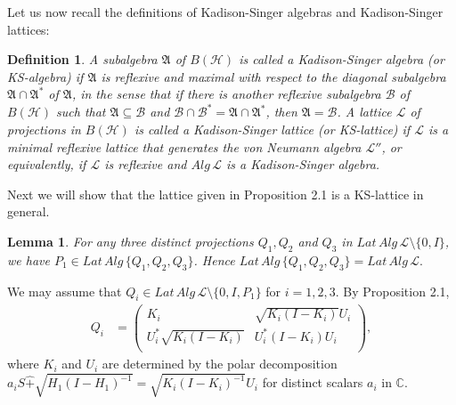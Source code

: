 \documentclass[12pt]{article}
\newtheorem{lemma}{Lemma}[section]
\newtheorem{df}{Definition}[section]
\newcommand{\AAA}{\mathfrak A} \newcommand{\TTT}{\mathfrak T}
\newcommand{\HHH}{\mathcal H} %
\newcommand{\LLL}{\mathcal L} %
\newcommand{\C}{\mathbb C} %
\def\L{{\mathcal{L}}}
\begin{document}
{Let us now recall the definitions of  Kadison-Singer algebras and
Kadison-Singer lattices:

\begin{df}
A subalgebra $\AAA$ of $B(\HHH)$ is called a Kadison-Singer algebra
(or KS-algebra) if $\AAA$ is reflexive and maximal with respect to
the diagonal subalgebra $\AAA \cap \AAA^*$ of $\AAA$, in the sense
that if there is another reflexive subalgebra $\mathcal{B}$ of
$B(\HHH)$ such that $\AAA \subseteq\mathcal{B}$ and
$\mathcal{B}\cap\mathcal{B}^*=\AAA \cap\AAA^*$, then
$\AAA=\mathcal{B}$. A lattice $\L$ of projections in $B(\HHH)$ is
called a Kadison-Singer lattice (or KS-lattice) if $\L$ is a minimal
reflexive lattice that generates the von Neumann algebra $\L''$, or
equivalently, if $\L$ is reflexive and $Alg\,\L$ is a Kadison-Singer
algebra.
\end{df}

Next we will show that the lattice given in Proposition 2.1 is a KS-lattice in general.

\begin{lemma}
For any three distinct projections $Q_1, Q_2$ and $Q_3$ in
$Lat\,Alg\,\LLL \setminus \{0, I \}$, we have $P_{1} \in
Lat\,Alg\,\{ Q_{1}, Q_{2}, Q_{3}\}$. Hence $Lat\,Alg\,\{Q_{1},
Q_{2}, Q_{3}\}=Lat\,Alg\,\L.$
\end{lemma}

\quad We may assume that $Q_i\in Lat\,Alg\,\LLL
\setminus \{0, I, P_1 \}$ for $i = 1,2,3$. By Proposition 2.1,
\begin{align*}
Q_{i}& =\left(
          \begin{array}{cc}
            K_{i} & \sqrt{K_{i}(I-K_{i})}U_{i} \\
            U_{i}^{*}\sqrt{K_{i}(I-K_{i})} & U_{i}^{*}(I-K_{i})U_{i} \\
          \end{array}
        \right),
\end{align*}
where $K_i$ and $U_i$ are determined by the polar decomposition
$a_{i}S \widehat{+}
\sqrt{H_{1}(I-H_{1})^{-1}}=\sqrt{K_{i}(I-K_{i})^{-1}} U_{i}$ for
distinct scalars $a_{i}$ in $\C$.

}
\end{document}
